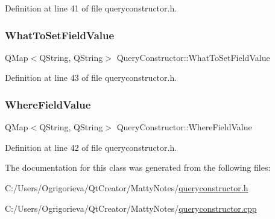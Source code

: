 Definition at line 41 of file queryconstructor.\+h.

\hypertarget{classQueryConstructor_a13e503b74e3422d2b816e5e41e646f04}{}\label{classQueryConstructor_a13e503b74e3422d2b816e5e41e646f04} 
\subsubsection{\texorpdfstring{What\+To\+Set\+Field\+Value}{WhatToSetFieldValue}}
{\footnotesize\ttfamily Q\+Map$<$Q\+String, Q\+String$>$ Query\+Constructor\+::\+What\+To\+Set\+Field\+Value\hspace{0.3cm}{\ttfamily [private]}}



Definition at line 43 of file queryconstructor.\+h.

\hypertarget{classQueryConstructor_ad20cc356b8452f51ddb326e989b3db9d}{}\label{classQueryConstructor_ad20cc356b8452f51ddb326e989b3db9d} 
\subsubsection{\texorpdfstring{Where\+Field\+Value}{WhereFieldValue}}
{\footnotesize\ttfamily Q\+Map$<$Q\+String, Q\+String$>$ Query\+Constructor\+::\+Where\+Field\+Value\hspace{0.3cm}{\ttfamily [private]}}



Definition at line 42 of file queryconstructor.\+h.



The documentation for this class was generated from the following files\+:\begin{DoxyCompactItemize}
\item 
C\+:/\+Users/\+Ogrigorieva/\+Qt\+Creator/\+Matty\+Notes/\hyperlink{queryconstructor_8h}{queryconstructor.\+h}\item 
C\+:/\+Users/\+Ogrigorieva/\+Qt\+Creator/\+Matty\+Notes/\hyperlink{queryconstructor_8cpp}{queryconstructor.\+cpp}\end{DoxyCompactItemize}
